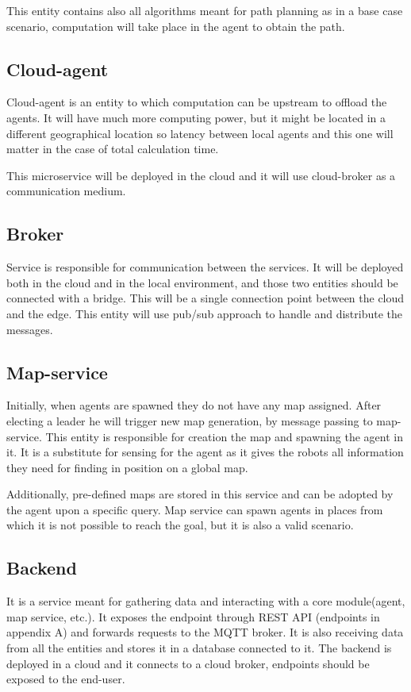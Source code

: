 This entity contains also all algorithms meant for path planning as in a base case scenario, computation will take place in the agent to obtain the path.

\subsection{Cloud-agent}
Cloud-agent is an entity to which computation can be upstream to offload the agents. It will have much more computing power, but it might be located in a different geographical location so latency between local agents and this one will matter in the case of total calculation time.

This microservice will be deployed in the cloud and it will use cloud-broker as a communication medium.

\subsection{Broker}
Service is responsible for communication between the services. It will be deployed both in the cloud and in the local environment, and those two entities should be connected with a bridge. This will be a single connection point between the cloud and the edge. This entity will use pub/sub approach to handle and distribute the messages.

\subsection{Map-service}
Initially, when agents are spawned they do not have any map assigned. After electing a leader he will trigger new map generation, by message passing to map-service. This entity is responsible for creation the map and spawning the agent in it. It is a substitute for sensing for the agent as it gives the robots all information they need for finding in position on a global map.

Additionally, pre-defined maps are stored in this service and can be adopted by the agent upon a specific query. Map service can spawn agents in places from which it is not possible to reach the goal, but it is also a valid scenario.

\subsection{Backend}
It is a service meant for gathering data and interacting with a core module(agent, map service, etc.). It exposes the endpoint through REST API (endpoints in appendix A) and forwards requests to the MQTT broker. It is also receiving data from all the entities and stores it in a database connected to it. The backend is deployed in a cloud and it connects to a cloud broker, endpoints should be exposed to the end-user.


